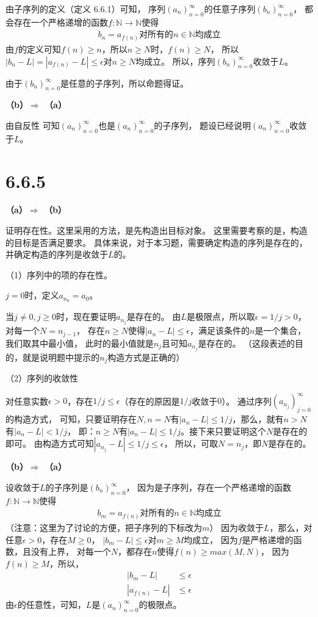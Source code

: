 \documentclass{article}
\theoremstyle{mystyle}
\begin{document}
由子序列的定义（定义 6.6.1）可知，
序列$(a_n)_{n=0}^\infty$的任意子序列$(b_n)_{n=0}^\infty$，
都会存在一个严格递增的函数$f : \mathbb{N} \rightarrow \mathbb{N}$使得
\begin{align*}
  b_n = a_{f(n)} \text{对所有的$n \in \mathbb{N}$均成立}
\end{align*}
由$f$的定义可知$f(n) \geq n$，所以$n \geq N$时，$f(n) \geq N$，
所以$|b_n - L| = |a_{f(n)} - L | \leq \epsilon$对$n \geq N$均成立。
所以，序列$(b_n)_{n=0}^\infty$收敛于$L$。

由于$(b_n)_{n=0}^\infty$是任意的子序列，所以命题得证。

\textbf{（b）$\Rightarrow$ （a）}

由自反性 可知$(a_n)_{n=0}^\infty$也是$(a_n)_{n=0}^\infty$的子序列，
题设已经说明$(a_n)_{n=0}^\infty$收敛于$L$。

\section*{6.6.5}

\textbf{（a）$\Rightarrow$ （b）}

证明存在性。这里采用的方法，是先构造出目标对象。
这里需要考察的是，构造的目标是否满足要求。
具体来说，对于本习题，需要确定构造的序列是存在的，并确定构造的序列是收敛于$L$的。

（1）序列中的项的存在性。

$j=0$时，定义$a_{n_0}=a_0$。

当$j \neq 0, j \geq 0$时，现在要证明$a_{n_j}$是存在的。
由$L$是极限点，所以取$\epsilon = 1/j > 0$，对每一个$N=n_{j-1}$，
存在$n \geq N$使得$|a_n - L| \leq \epsilon$，满足该条件的$n$是一个集合，我们取其中最小值，
此时的最小值就是$n_j$且可知$a_{n_j}$是存在的。
（这段表述的目的，就是说明题中提示的$n_j$构造方式是正确的）

（2）序列的收敛性

对任意实数$\epsilon > 0$，存在$1/j \leq \epsilon$（存在的原因是$1/j$收敛于$0$）。
通过序列$(a_{n_j})_{j=0}^\infty$的构造方式，
可知，只要证明存在$N, n = N$有$|a_n - L| \leq 1/j$，那么，就有$n > N$有$|a_n - L| < 1/j$，
即：$n \geq N$有$|a_n - L| \leq 1/j$。接下来只要证明这个$N$是存在的即可。
由构造方式可知$|a_{n_j} - L | \leq 1/j \leq \epsilon$，
所以，可取$N = n_j$，即$N$是存在的。


\textbf{（b）$\Rightarrow$ （a）}

设收敛于$L$的子序列是$(b_n)_{n=0}^\infty$，
因为是子序列，存在一个严格递增的函数$f : \mathbb{N} \rightarrow \mathbb{N}$使得
\begin{align*}
  b_m = a_{f(n)} \text{对所有的$n \in \mathbb{N}$均成立}
\end{align*}
（注意：这里为了讨论的方便，把子序列的下标改为$m$）
因为收敛于$L$，那么，对任意$\epsilon > 0$，存在$M \geq 0$，
$|b_m - L| \leq \epsilon$对$m \geq M$均成立，
因为$f$是严格递增的函数，且没有上界，
对每一个$N$，都存在$n$使得$f(n) \geq max(M, N)$，
因为$f(n) \geq M$，所以，
\begin{align*}
  |b_m - L|      & \leq \epsilon \\
  |a_{f(n)} - L| & \leq \epsilon
\end{align*}
由$\epsilon$的任意性，可知，$L$是$(a_n)_{n=0}^\infty$的极限点。
\end{document}
